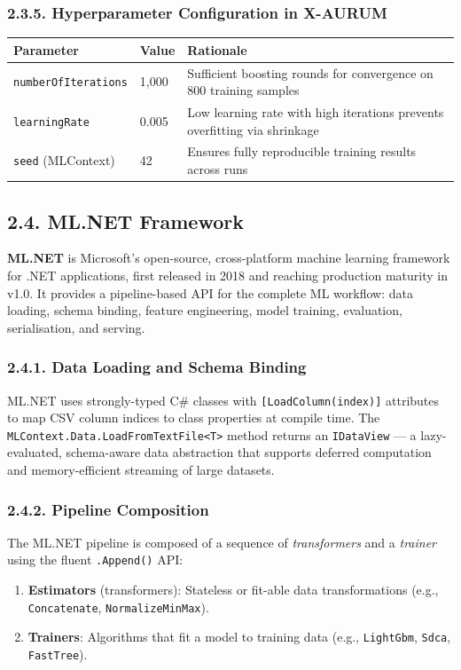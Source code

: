 \subsubsection{2.3.5. Hyperparameter Configuration in X-AURUM}

\begin{center}
\begin{tabular}{|p{4.5cm}|l|p{6.5cm}|}
\hline
\textbf{Parameter} & \textbf{Value} & \textbf{Rationale}\\
\hline
\texttt{numberOfIterations} & 1,000 & Sufficient boosting rounds for convergence on 800 training samples\\
\texttt{learningRate} & 0.005 & Low learning rate with high iterations prevents overfitting via shrinkage\\
\texttt{seed} (MLContext) & 42 & Ensures fully reproducible training results across runs\\
\hline
\end{tabular}
\end{center}

\subsection{2.4. ML.NET Framework}

\textbf{ML.NET} is Microsoft's open-source, cross-platform machine learning framework for .NET applications, first released in 2018 and reaching production maturity in v1.0. It provides a pipeline-based API for the complete ML workflow: data loading, schema binding, feature engineering, model training, evaluation, serialisation, and serving.

\subsubsection{2.4.1. Data Loading and Schema Binding}
ML.NET uses strongly-typed C\# classes with \texttt{[LoadColumn(index)]} attributes to map CSV column indices to class properties at compile time. The \texttt{MLContext.Data.LoadFromTextFile<T>} method returns an \texttt{IDataView} --- a lazy-evaluated, schema-aware data abstraction that supports deferred computation and memory-efficient streaming of large datasets.

\subsubsection{2.4.2. Pipeline Composition}
The ML.NET pipeline is composed of a sequence of \textit{transformers} and a \textit{trainer} using the fluent \texttt{.Append()} API:
\begin{enumerate}
  \item \textbf{Estimators} (transformers): Stateless or fit-able data transformations (e.g., \texttt{Concatenate}, \texttt{NormalizeMinMax}).
  \item \textbf{Trainers}: Algorithms that fit a model to training data (e.g., \texttt{LightGbm}, \texttt{Sdca}, \texttt{FastTree}).
\end{enumerate}

